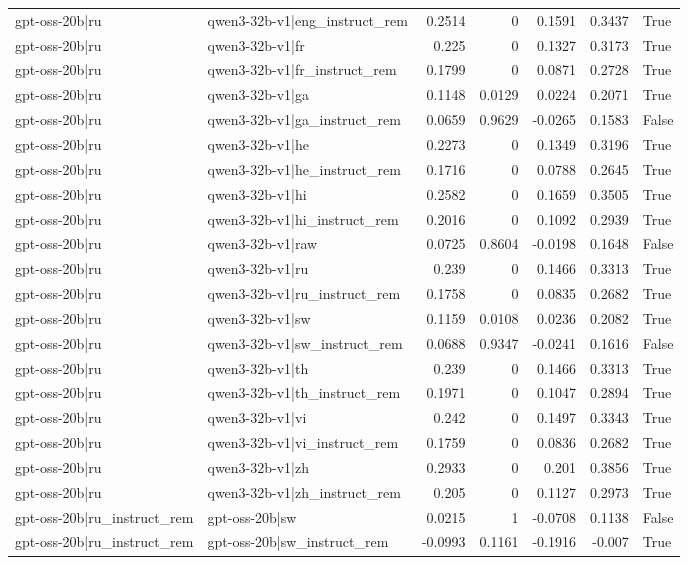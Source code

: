 \begin{table}
\begin{tabular}{l l r r r r l}
gpt-oss-20b|ru & qwen3-32b-v1|eng_instruct_rem & 0.2514 & 0 & 0.1591 & 0.3437 & True \\
gpt-oss-20b|ru & qwen3-32b-v1|fr & 0.225 & 0 & 0.1327 & 0.3173 & True \\
gpt-oss-20b|ru & qwen3-32b-v1|fr_instruct_rem & 0.1799 & 0 & 0.0871 & 0.2728 & True \\
gpt-oss-20b|ru & qwen3-32b-v1|ga & 0.1148 & 0.0129 & 0.0224 & 0.2071 & True \\
gpt-oss-20b|ru & qwen3-32b-v1|ga_instruct_rem & 0.0659 & 0.9629 & -0.0265 & 0.1583 & False \\
gpt-oss-20b|ru & qwen3-32b-v1|he & 0.2273 & 0 & 0.1349 & 0.3196 & True \\
gpt-oss-20b|ru & qwen3-32b-v1|he_instruct_rem & 0.1716 & 0 & 0.0788 & 0.2645 & True \\
gpt-oss-20b|ru & qwen3-32b-v1|hi & 0.2582 & 0 & 0.1659 & 0.3505 & True \\
gpt-oss-20b|ru & qwen3-32b-v1|hi_instruct_rem & 0.2016 & 0 & 0.1092 & 0.2939 & True \\
gpt-oss-20b|ru & qwen3-32b-v1|raw & 0.0725 & 0.8604 & -0.0198 & 0.1648 & False \\
gpt-oss-20b|ru & qwen3-32b-v1|ru & 0.239 & 0 & 0.1466 & 0.3313 & True \\
gpt-oss-20b|ru & qwen3-32b-v1|ru_instruct_rem & 0.1758 & 0 & 0.0835 & 0.2682 & True \\
gpt-oss-20b|ru & qwen3-32b-v1|sw & 0.1159 & 0.0108 & 0.0236 & 0.2082 & True \\
gpt-oss-20b|ru & qwen3-32b-v1|sw_instruct_rem & 0.0688 & 0.9347 & -0.0241 & 0.1616 & False \\
gpt-oss-20b|ru & qwen3-32b-v1|th & 0.239 & 0 & 0.1466 & 0.3313 & True \\
gpt-oss-20b|ru & qwen3-32b-v1|th_instruct_rem & 0.1971 & 0 & 0.1047 & 0.2894 & True \\
gpt-oss-20b|ru & qwen3-32b-v1|vi & 0.242 & 0 & 0.1497 & 0.3343 & True \\
gpt-oss-20b|ru & qwen3-32b-v1|vi_instruct_rem & 0.1759 & 0 & 0.0836 & 0.2682 & True \\
gpt-oss-20b|ru & qwen3-32b-v1|zh & 0.2933 & 0 & 0.201 & 0.3856 & True \\
gpt-oss-20b|ru & qwen3-32b-v1|zh_instruct_rem & 0.205 & 0 & 0.1127 & 0.2973 & True \\
gpt-oss-20b|ru_instruct_rem & gpt-oss-20b|sw & 0.0215 & 1 & -0.0708 & 0.1138 & False \\
gpt-oss-20b|ru_instruct_rem & gpt-oss-20b|sw_instruct_rem & -0.0993 & 0.1161 & -0.1916 & -0.007 & True \\

\end{tabular}
\end{table}
